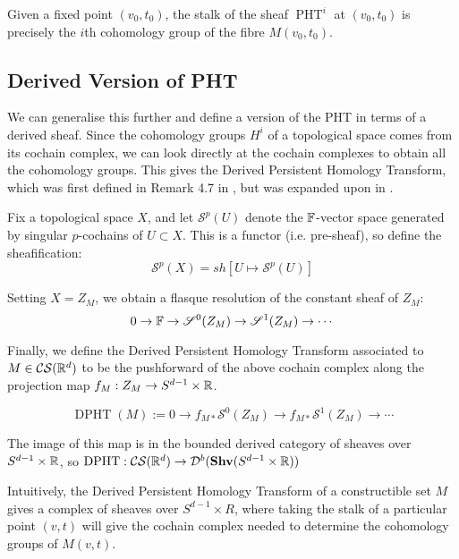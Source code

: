 Given a fixed point \((v_0,t_0)\), the stalk of the sheaf \(\operatorname{PHT}^i\) at \((v_0,t_0)\) is precisely the \(i\)th cohomology group of the fibre \(M(v_0,t_0)\). 

\subsection{Derived Version of PHT}

We can generalise this further and define a version of the PHT in terms of a derived sheaf. Since the cohomology groups \(H^i\) of a topological space comes from its cochain complex, we can look directly at the cochain complexes to obtain all the cohomology groups. This gives the Derived Persistent Homology Transform, which was first defined in Remark 4.7 in \cite{Curry2018Directions}, but was expanded upon in \cite{Arya2022ShapeSpace}.

\begin{definition}
    Fix a topological space \(X\), and let \(\mathcal{S}^p(U)\) denote the \(\mathbb{F}\)-vector space generated by singular \(p\)-cochains of \(U\subset X\). This is a functor (i.e. pre-sheaf), so define the sheafification:
    \[\mathscr{S}^p(X)=sh[U\mapsto \mathcal{S}^p(U)]\]

    Setting \(X=Z_M\), we obtain a flasque resolution of the constant sheaf of \(Z_M\):
    \[0\rightarrow \mathbb{F} \rightarrow \mathscr{S}^0(Z_M)\rightarrow \mathscr{S}^1(Z_M)\rightarrow \cdots\]

    Finally, we define the Derived Persistent Homology Transform associated to \(M\in\mathcal{CS}(\mathbb{R}^d)\) to be the pushforward of the above cochain complex along the projection map \(f_M:Z_M\rightarrow S^{d-1}\times \mathbb{R}\). 
    
    \[\operatorname{DPHT}(M) := 0\rightarrow f_{M*}\mathscr{S}^0(Z_M)\rightarrow f_{M*}\mathscr{S}^1(Z_M)\rightarrow \cdots\]

    The image of this map is in the bounded derived category of sheaves over \(S^{d-1}\times \mathbb{R}\), so \(\operatorname{DPHT}:\mathcal{CS}(\mathbb{R}^d)\rightarrow \mathcal{D}^b(\mathbf{Shv}(S^{d-1}\times\mathbb{R}))\)
\end{definition}

Intuitively, the Derived Persistent Homology Transform of a constructible set \(M\) gives a complex of sheaves over \(S^{d-1}\times R\), where taking the stalk of a particular point \((v,t)\) will give the cochain complex needed to determine the cohomology groups of \(M(v,t)\).

